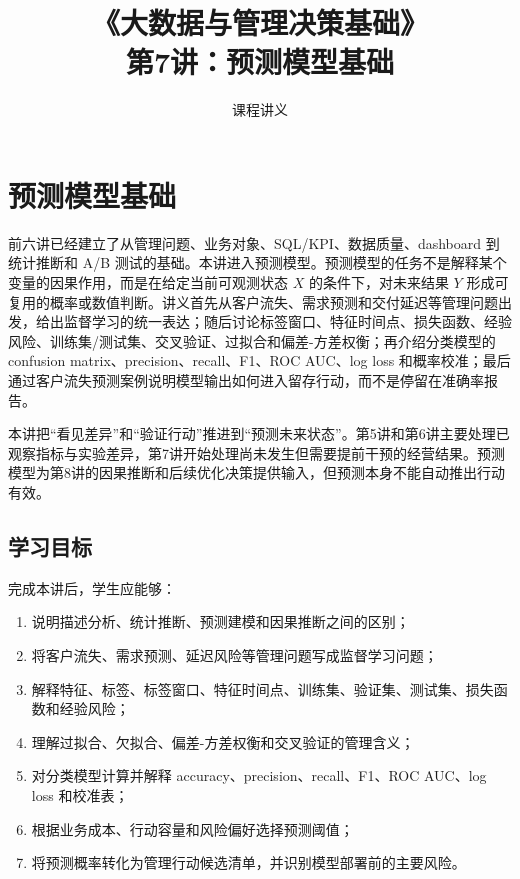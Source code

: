 \documentclass[UTF8,fontset=fandol,openany,zihao=-4]{ctexbook}
\title{《大数据与管理决策基础》\\[0.5em]\large 第7讲：预测模型基础}
\author{课程讲义}
\date{}
\begin{document}
\maketitle
\tableofcontents

\setcounter{chapter}{6}
\chapter{预测模型基础}
\label{ch:week07-prediction}

\begin{chapterbox}
前六讲已经建立了从管理问题、业务对象、SQL/KPI、数据质量、dashboard 到统计推断和 A/B 测试的基础。本讲进入预测模型。预测模型的任务不是解释某个变量的因果作用，而是在给定当前可观测状态 \(X\) 的条件下，对未来结果 \(Y\) 形成可复用的概率或数值判断。讲义首先从客户流失、需求预测和交付延迟等管理问题出发，给出监督学习的统一表达；随后讨论标签窗口、特征时间点、损失函数、经验风险、训练集/测试集、交叉验证、过拟合和偏差-方差权衡；再介绍分类模型的 confusion matrix、precision、recall、F1、ROC AUC、log loss 和概率校准；最后通过客户流失预测案例说明模型输出如何进入留存行动，而不是停留在准确率报告。
\end{chapterbox}

\begin{modernbox}[课程接口]
本讲把“看见差异”和“验证行动”推进到“预测未来状态”。第5讲和第6讲主要处理已观察指标与实验差异，第7讲开始处理尚未发生但需要提前干预的经营结果。预测模型为第8讲的因果推断和后续优化决策提供输入，但预测本身不能自动推出行动有效。
\end{modernbox}

\section{学习目标}

完成本讲后，学生应能够：
\begin{enumerate}
  \item 说明描述分析、统计推断、预测建模和因果推断之间的区别；
  \item 将客户流失、需求预测、延迟风险等管理问题写成监督学习问题；
  \item 解释特征、标签、标签窗口、特征时间点、训练集、验证集、测试集、损失函数和经验风险；
  \item 理解过拟合、欠拟合、偏差-方差权衡和交叉验证的管理含义；
  \item 对分类模型计算并解释 accuracy、precision、recall、F1、ROC AUC、log loss 和校准表；
  \item 根据业务成本、行动容量和风险偏好选择预测阈值；
  \item 将预测概率转化为管理行动候选清单，并识别模型部署前的主要风险。
\end{enumerate}
\end{document}
